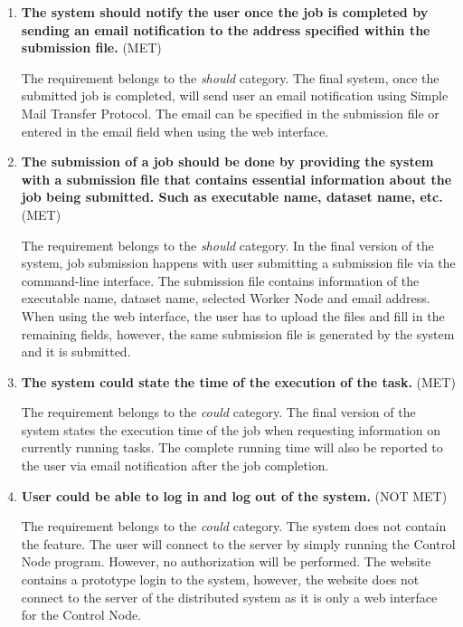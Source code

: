 \documentclass[10pt]{report}
\begin{document}
\begin{enumerate}
    \item \textbf{The system should notify the user once the job is completed by sending an email notification to the address specified within the submission file.} (MET)

    The requirement belongs to the \textit{should} category. The final system, once the submitted job is completed, will send user an email notification using Simple Mail Transfer Protocol. The email can be specified in the submission file or entered in the email field when using the web interface.

    \item \textbf{The submission of a job should be done by providing the system with a submission file that contains essential information about the job being submitted. Such as executable name, dataset name, etc.} (MET)

    The requirement belongs to the \textit{should} category. In the final version of the system, job submission happens with user submitting a submission file via the command-line interface. The submission file contains information of the executable name, dataset name, selected Worker Node and email address. When using the web interface, the user has to upload the files and fill in the remaining fields, however, the same submission file is generated by the system and it is submitted.

    \item \textbf{The system could state the time of the execution of the task.} (MET)

    The requirement belongs to the \textit{could} category. The final version of the system states the execution time of the job when requesting information on currently running tasks. The complete running time will also be reported to the user via email notification after the job completion.

    \item \textbf{User could be able to log in and log out of the system.} (NOT MET)

    The requirement belongs to the \textit{could} category. The system does not contain the feature. The user will connect to the server by simply running the Control Node program. However, no authorization will be performed. The website contains a prototype login to the system, however, the website does not connect to the server of the distributed system as it is only a web interface for the Control Node.

\end{enumerate}
\end{document}
